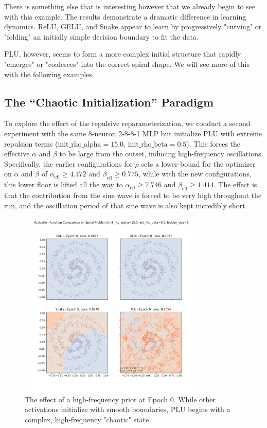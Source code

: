 \documentclass[11pt, letterpaper]{article}
\begin{document}
There is something else that is interesting however that we already begin to see with this example. The results demonstrate a dramatic difference in learning dynamics. ReLU, GELU, and Snake appear to learn by progressively "curving" or "folding" an initially simple decision boundary to fit the data.

PLU, however, seems to form a more complex initial structure that rapidly "emerges" or "coalesces" into the correct spiral shape. We will see more of this with the following examples.

\subsection{The ``Chaotic Initialization'' Paradigm}
\label{sec:chaotic_init}

To explore the effect of the repulsive reparameterization, we conduct a second experiment with the same 8-neuron 2-8-8-1 MLP but initialize PLU with extreme repulsion terms ($\text{init\_rho\_alpha}=15.0$, $\text{init\_rho\_beta}=0.5$). This forces the effective $\alpha$ and $\beta$ to be large from the outset, inducing high-frequency oscillations. Specifically, the earlier configurations for $\rho$ sets a lower-bound for the optimizer on $\alpha$ and $\beta$ of $\alpha_{\text{eff}} \ge 4.472$ and $\beta_{\text{eff}} \ge 0.775$, while with the new configurations, this lower floor is lifted all the way to $\alpha_{\text{eff}} \ge 7.746$ and $\beta_{\text{eff}} \ge 1.414$. The effect is that the contribution from the sine wave is forced to be very high throughout the run, and the oscillation period of that sine wave is also kept incredibly short.

\begin{figure}[H]
    \centering
    \includegraphics[width=0.8\textwidth]{Examples/spiral_activation_comparison_hidden_neurons_8_sin_pushed_extreme_epoch_0.jpg}
    \caption{The effect of a high-frequency prior at Epoch 0. While other activations initialize with smooth boundaries, PLU begins with a complex, high-frequency "chaotic" state.}
    \label{fig:chaotic_init}
\end{figure}
\end{document}
